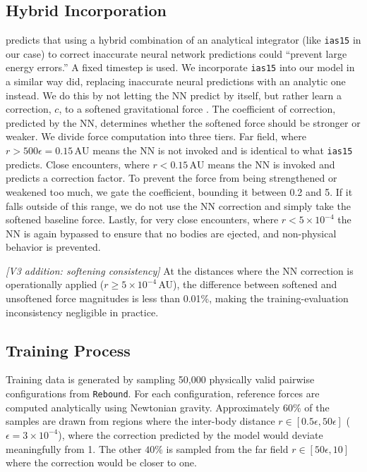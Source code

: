 \documentclass[12pt,a4paper]{article}
\begin{document}
\subsection{Hybrid Incorporation}
\cite{ulibarrena2024hybrid} predicts that using a hybrid combination of an analytical integrator (like \texttt{ias15} in our case) to correct inaccurate neural network predictions could ``prevent large energy errors.'' A fixed timestep is used. We incorporate \texttt{ias15} into our model in a similar way \cite{ulibarrena2024hybrid} did, replacing inaccurate neural predictions with an analytic one instead. We do this by not letting the NN predict by itself, but rather learn a correction, $c$, to a softened gravitational force \cite{kipf2018neural}. The coefficient of correction, predicted by the NN, determines whether the softened force should be stronger or weaker. We divide force computation into three tiers. Far field, where $r > 500\epsilon = 0.15\,\text{AU}$ means the NN is not invoked and is identical to what \texttt{ias15} predicts. Close encounters, where $r < 0.15\,\text{AU}$ means the NN is invoked and predicts a correction factor. To prevent the force from being strengthened or weakened too much, we gate the coefficient, bounding it between 0.2 and 5. If it falls outside of this range, we do not use the NN correction and simply take the softened baseline force. Lastly, for very close encounters, where $r < 5\times10^{-4}$ the NN is again bypassed to ensure that no bodies are ejected, and non-physical behavior is prevented.

\noindent\textit{[V3 addition: softening consistency]} At the distances where the NN correction is operationally applied ($r \geq 5\times10^{-4}$\,AU), the difference between softened and unsoftened force magnitudes is less than 0.01\%, making the training-evaluation inconsistency negligible in practice.

\subsection{Training Process}
\label{subsec:training}
Training data is generated by sampling 50,000 physically valid pairwise configurations from \texttt{Rebound}. For each configuration, reference forces are computed analytically using Newtonian gravity. Approximately $60\%$ of the samples are drawn from regions where the inter-body distance $r\in [0.5 \epsilon, 50 \epsilon]$ ($\epsilon = 3 \times10^{-4}$), where the correction predicted by the model would deviate meaningfully from 1. The other $40\%$ is sampled from the far field $r\in[50\epsilon, 10]$ where the correction would be closer to one.
\end{document}
